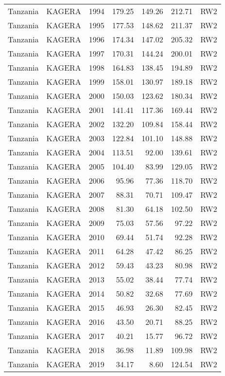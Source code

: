 \begin{longtable}{lllrrrl}
  Tanzania & KAGERA & 1994 & 179.25 & 149.26 & 212.71 & RW2 \\ 
  Tanzania & KAGERA & 1995 & 177.53 & 148.62 & 211.37 & RW2 \\ 
  Tanzania & KAGERA & 1996 & 174.34 & 147.02 & 205.32 & RW2 \\ 
  Tanzania & KAGERA & 1997 & 170.31 & 144.24 & 200.01 & RW2 \\ 
  Tanzania & KAGERA & 1998 & 164.83 & 138.45 & 194.89 & RW2 \\ 
  Tanzania & KAGERA & 1999 & 158.01 & 130.97 & 189.18 & RW2 \\ 
  Tanzania & KAGERA & 2000 & 150.03 & 123.62 & 180.34 & RW2 \\ 
  Tanzania & KAGERA & 2001 & 141.41 & 117.36 & 169.44 & RW2 \\ 
  Tanzania & KAGERA & 2002 & 132.20 & 109.84 & 158.44 & RW2 \\ 
  Tanzania & KAGERA & 2003 & 122.84 & 101.10 & 148.88 & RW2 \\ 
  Tanzania & KAGERA & 2004 & 113.51 & 92.00 & 139.61 & RW2 \\ 
  Tanzania & KAGERA & 2005 & 104.40 & 83.99 & 129.05 & RW2 \\ 
  Tanzania & KAGERA & 2006 & 95.96 & 77.36 & 118.70 & RW2 \\ 
  Tanzania & KAGERA & 2007 & 88.31 & 70.71 & 109.47 & RW2 \\ 
  Tanzania & KAGERA & 2008 & 81.30 & 64.18 & 102.50 & RW2 \\ 
  Tanzania & KAGERA & 2009 & 75.03 & 57.56 & 97.22 & RW2 \\ 
  Tanzania & KAGERA & 2010 & 69.44 & 51.74 & 92.28 & RW2 \\ 
  Tanzania & KAGERA & 2011 & 64.28 & 47.42 & 86.25 & RW2 \\ 
  Tanzania & KAGERA & 2012 & 59.43 & 43.23 & 80.98 & RW2 \\ 
  Tanzania & KAGERA & 2013 & 55.02 & 38.44 & 77.74 & RW2 \\ 
  Tanzania & KAGERA & 2014 & 50.82 & 32.68 & 77.69 & RW2 \\ 
  Tanzania & KAGERA & 2015 & 46.93 & 26.30 & 82.45 & RW2 \\ 
  Tanzania & KAGERA & 2016 & 43.50 & 20.71 & 88.25 & RW2 \\ 
  Tanzania & KAGERA & 2017 & 40.21 & 15.77 & 96.72 & RW2 \\ 
  Tanzania & KAGERA & 2018 & 36.98 & 11.89 & 109.98 & RW2 \\ 
  Tanzania & KAGERA & 2019 & 34.17 & 8.60 & 124.54 & RW2 \\ 

\end{longtable}
